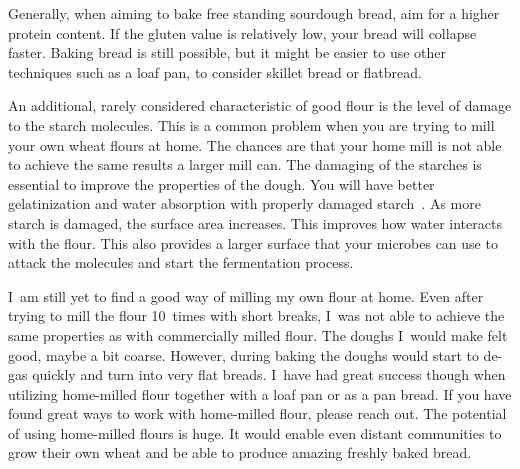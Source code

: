 Generally, when aiming to
bake free standing sourdough bread, aim for a higher protein content. If the
gluten value is relatively low, your bread will collapse faster. Baking bread
is still possible, but it might be easier to use other techniques such as a
loaf pan, to consider skillet bread or flatbread.

An additional, rarely considered characteristic of good flour is the level of damage to the
starch molecules. This is a common problem when you are trying to mill your own wheat flours at
home. The chances are that your home mill is not able to achieve the same results
a larger mill can. The damaging of the starches is essential to improve the
properties of the dough. You will have better gelatinization and water
absorption with properly damaged starch~\cite{starch+damage+flour}. As more
starch is damaged, the surface area increases. This improves how water interacts with the flour.
This also provides a larger surface that your microbes can use to attack the molecules
and start the fermentation process.

I~am still
yet to find a good way of milling my own flour at home. Even after trying to
mill the flour 10~times with short breaks, I~was not able to achieve the same
properties as with commercially milled flour. The doughs I~would make felt
good, maybe a bit coarse. However, during baking the doughs would start to
de-gas quickly and turn into very flat breads. I~have had great success though when
utilizing home-milled flour together with a loaf pan or as a pan bread. If you
have found great ways to work with home-milled flour, please reach out. The potential
of using home-milled flours is huge. It would enable even distant communities
to grow their own wheat and be able to produce amazing freshly baked bread.
